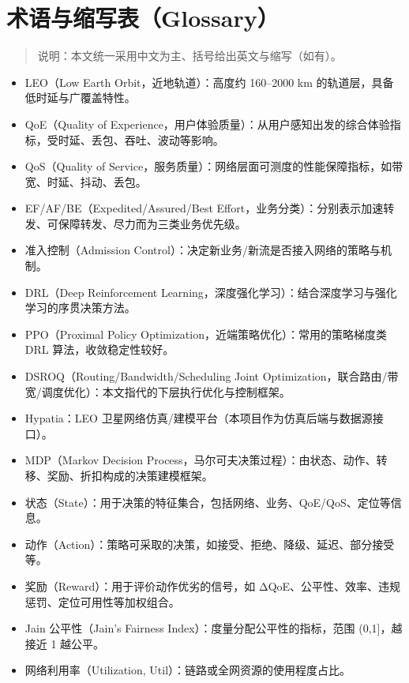 \section{术语与缩写表（Glossary）}\label{ux672fux8bedux4e0eux7f29ux5199ux8868glossary}

\begin{quote}
说明：本文统一采用中文为主、括号给出英文与缩写（如有）。
\end{quote}

\begin{itemize}
\tightlist
\item
  LEO（Low Earth Orbit，近地轨道）：高度约 160--2000 km
  的轨道层，具备低时延与广覆盖特性。
\item
  QoE（Quality of
  Experience，用户体验质量）：从用户感知出发的综合体验指标，受时延、丢包、吞吐、波动等影响。
\item
  QoS（Quality of
  Service，服务质量）：网络层面可测度的性能保障指标，如带宽、时延、抖动、丢包。
\item
  EF/AF/BE（Expedited/Assured/Best
  Effort，业务分类）：分别表示加速转发、可保障转发、尽力而为三类业务优先级。
\item
  准入控制（Admission
  Control）：决定新业务/新流是否接入网络的策略与机制。
\item
  DRL（Deep Reinforcement
  Learning，深度强化学习）：结合深度学习与强化学习的序贯决策方法。
\item
  PPO（Proximal Policy Optimization，近端策略优化）：常用的策略梯度类
  DRL 算法，收敛稳定性较好。
\item
  DSROQ（Routing/Bandwidth/Scheduling Joint
  Optimization，联合路由/带宽/调度优化）：本文指代的下层执行优化与控制框架。
\item
  Hypatia：LEO 卫星网络仿真/建模平台（本项目作为仿真后端与数据源接口）。
\item
  MDP（Markov Decision
  Process，马尔可夫决策过程）：由状态、动作、转移、奖励、折扣构成的决策建模框架。
\item
  状态（State）：用于决策的特征集合，包括网络、业务、QoE/QoS、定位等信息。
\item
  动作（Action）：策略可采取的决策，如接受、拒绝、降级、延迟、部分接受等。
\item
  奖励（Reward）：用于评价动作优劣的信号，如
  ΔQoE、公平性、效率、违规惩罚、定位可用性等加权组合。
\item
  Jain 公平性（Jain's Fairness Index）：度量分配公平性的指标，范围
  (0,1{]}，越接近 1 越公平。
\item
  网络利用率（Utilization, Util）：链路或全网资源的使用程度占比。

\end{itemize}

